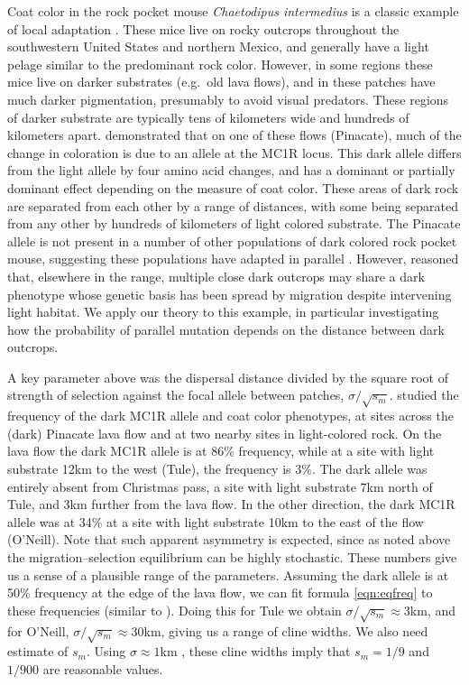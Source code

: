 \documentclass{article}
\newcommand{\revpoint}[2]{}
\newcommand{\citep}[1]{\cite{#1}}
\newcommand{\citet}[1]{\cite{#1}}
\begin{document}
Coat color in the rock pocket mouse
\emph{Chaetodipus intermedius} is a classic example of local
adaptation 
\citep{benson1933concealing,DiceBlossom1937}.
These mice live on rocky outcrops throughout the southwestern United States and northern Mexico, 
and generally have a light pelage similar to the predominant rock color.
However, in some regions these mice live on darker substrates (e.g.\ old lava flows),
and in these patches have much darker pigmentation, 
presumably to avoid visual predators.
These regions of darker substrate are typically tens of kilometers wide and hundreds of kilometers apart. \revpoint{5}{7}
\citet{nachman2003genetic} demonstrated that on one of these flows (Pinacate), 
much of the change in coloration is due to an allele at the MC1R locus.
This dark allele differs from the light allele by four amino acid changes, 
and has a dominant or partially dominant effect depending on the measure of coat color.
These areas of dark rock are separated from each other by a range of distances, 
with some being separated from any other by hundreds of kilometers of light colored substrate. 
The Pinacate allele is not present in a number of other populations of dark colored rock pocket mouse, 
suggesting these populations have adapted in parallel \citep{nachman2003genetic,hoekstra2003different}.
However, \citet{hoekstra2004local} reasoned that, elsewhere in the range, 
multiple close dark outcrops may share a dark phenotype whose genetic basis has been spread by migration
despite intervening light habitat. 
We apply our theory to this example,
in particular investigating how the probability of parallel mutation depends on 
the distance between dark outcrops.

A key parameter above was the dispersal distance divided by the square root of strength of selection against the focal allele between patches, $\sigma/\sqrt{s_m}$. 
\citet{hoekstra2004ecological} studied the frequency of the dark MC1R allele and coat color phenotypes, 
at sites across the (dark) Pinacate lava flow and at two nearby sites in light-colored rock.
On the lava flow the dark MC1R allele is at 86\% frequency,
while at a site with light substrate 12km to the west (Tule), the frequency is 3\%.
The dark allele was entirely absent from Christmas pass, a site with light substrate 7km north of Tule, and 3km further from the lava flow.
In the other direction, the dark MC1R allele was at 34\% at a site with light substrate 10km to the east of the flow (O'Neill).
Note that such apparent asymmetry is expected,
since as noted above the migration--selection equilibrium can be highly stochastic.
These numbers give us a sense of a plausible range of the parameters.
Assuming the dark allele is at 50\% frequency at the edge of the lava flow, 
we can fit formula \eqref{eqn:eqfreq} to these frequencies
(similar to \citet{hoekstra2004ecological}).
Doing this for Tule we obtain $\sigma/\sqrt{s_m} \approx 3$km, 
and for O'Neill, $\sigma/\sqrt{s_m} \approx 30$km, giving us a range of cline widths. 
We also need estimate of $s_m$. 
Using $\sigma \approx 1$km \citep{french1968dispersal,allred1963range}, 
these cline widths imply that $s_m=1/9$ and $1/900$ are reasonable values.
\end{document}
